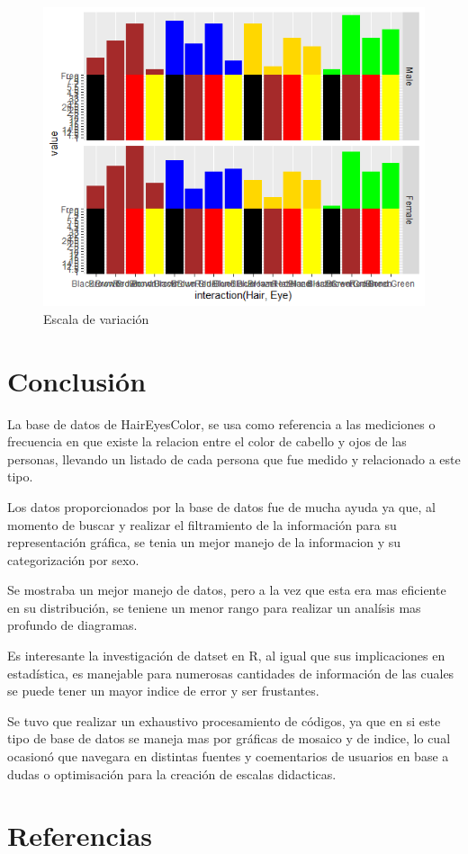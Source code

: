 \documentclass[12pt,a4paper]{article}
\begin{document}
\begin{figure}
\centering
\includegraphics[scale=0.8]{Escala}
\caption{Escala de variación}
\label{fig:Escala}
\end{figure}

\newpage
\section{Conclusión}
La base de datos de HairEyesColor, se usa como referencia a las mediciones o frecuencia en que existe la relacion entre el color de cabello y ojos de las personas, llevando un listado de cada persona que fue medido y relacionado a este tipo. 

Los datos proporcionados por la base de datos fue de mucha ayuda ya que, al momento de buscar y realizar el filtramiento de la información para su representación gráfica, se tenia un mejor manejo de la informacion y su categorización por sexo.

Se mostraba un mejor manejo de datos, pero a la vez que esta era mas eficiente en su distribución, se teniene un menor rango para realizar un analísis mas profundo de diagramas.

Es interesante la investigación de datset en R, al igual que sus implicaciones en estadística, es manejable para numerosas cantidades de información de las cuales se puede tener un mayor indice de error y ser frustantes.

Se tuvo que realizar un exhaustivo procesamiento de códigos, ya que en si este tipo de base de datos se maneja mas por gráficas de mosaico y de indice, lo cual ocasionó que navegara en distintas fuentes y coementarios de usuarios en base a dudas o optimisación para la creación de escalas didacticas.\citep{repositorio}



\newpage

\section{Referencias}



\end{document}
